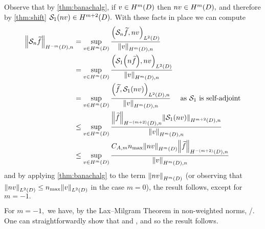 Observe that by \cref{thm:banachalg}, if $v \in \HmD$ then $nv \in \HmD,$ and therefore by \cref{thm:shift} $\sdsolo(nv) \in \HmptD.$ With these facts in place we can compute
\begin{align*}
\NHnfn{-m}{D}{\sdsol \ftilde} &= \sup_{v \in \HmD} \frac{\IPLtD{\sdsol \ftilde}{nv}}{\NHmDn{v}}\\
&= \sup_{v \in \HmD} \frac{\IPLtD{\sdsolo\mleft(n \ftilde\mright)}{nv}}{\NHmDn{v}}\\
&= \sup_{v \in \HmD} \frac{\IPLtDn{\ftilde}{\sdsolo\mleft(n v\mright)}}{\NHmDn{v}}\quad\tas \sdsolo \text{ is self-adjoint}\\
&\leq \sup_{v \in \HmD} \frac{\NHnfn{-(m+2)}{D}{\ftilde}\NHnfn{m+2}{D}{\sdsolo\mleft(nv\mright)} }{\NHmDn{v}}\\
&\leq \sup_{v \in \HmD}  \frac{\CAfn{m} \nmax \NHmD{nv} \NHnfn{-(m+2)}{D}{\ftilde}}{\NHmDn{v}}
\end{align*}
and by applying \cref{thm:banachalg} to the term $\NHfn{m}{D}{nv}$ (or observing that $\NLtD{nv} \leq \nmax\NLtD{v}$ in the case $m=0$), the result follows, except for $m=-1.$

For $m=-1,$ we have, by the Lax--Milgram Theorem in non-weighted norms,
\beqs
\NHoD{\Sn \ftilde} \leq {}/\Amin.
\eeqs
One can straightforwardly show that
\beqs
{} \leq \nmax \NHoD{\Sn \ftilde}
\eeqs
and
\beqs
{} \leq \nmax {},
\eeqs
and so the result follows.
\epf


